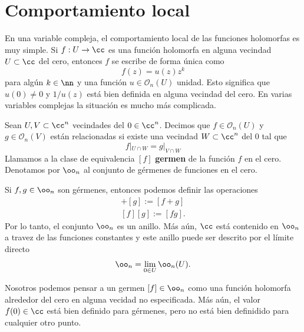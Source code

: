 \section{Comportamiento local}\label{complocal}
	
	En una variable compleja, el comportamiento local de las funciones holomorfas es muy simple. Si $f:U\to\cc$ es una función holomorfa en alguna vecindad $U\subset\cc$ del cero, entonces $f$ se escribe de forma única como
	\begin{equation*}
		f(z)=u(z)z^k
	\end{equation*} 
	para algún $k\in\nn$ y una función $u\in\mathscr{O}_n(U)$ unidad. Esto significa que $u(0)\neq 0$ y $1/u(z)$ está bien definida en alguna vecindad del cero. En varias variables complejas la situación es mucho más complicada.\\
	\begin{definition}
		Sean $U,V\subset \cc^n$ vecindades del $0\in\cc^n$. Decimos que $f\in\mathscr{O}_n(U)$ y $g\in\mathscr{O}_n(V)$ están relacionadas si existe una vecindad $W\subset\cc^n$ del $0$ tal que
		\begin{equation*}
			f|_{U\cap W}=g|_{V\cap W}
		\end{equation*} 
		Llamamos a la clase de equivalencia $[f]$ \textbf{germen} de la función $f$ en el cero.
		Denotamos por $\oo_{n}$ al conjunto de gérmenes de funciones en el cero.
	\end{definition}
	
	\begin{remark}
		Si $f,g\in \oo_{n}$ son gérmenes, entonces podemos definir las operaciones
		\begin{align*}
			[f]+[g]:=[f+g]\\
			[f][g]:=[fg].
		\end{align*}
		Por lo tanto, el conjunto $\oo_{n}$ es un anillo. Más aún, $\cc$ está contenido en $\oo_{n}$ a travez de las funciones constantes y este anillo puede ser descrito por el límite directo
		\begin{equation*}
			\oo_{n}=\lim_{0\in U}\oo_n(U).
		\end{equation*} 
	\end{remark}
	
	Nosotros podemos pensar a un germen $[f]\in\oo_{n}$ como una función holomorfa alrededor del cero en alguna vecidad no especificada. Más aún, el valor $f(0)\in\cc$ está bien definido para gérmenes, pero no está bien definidido para cualquier otro punto.\\
	
